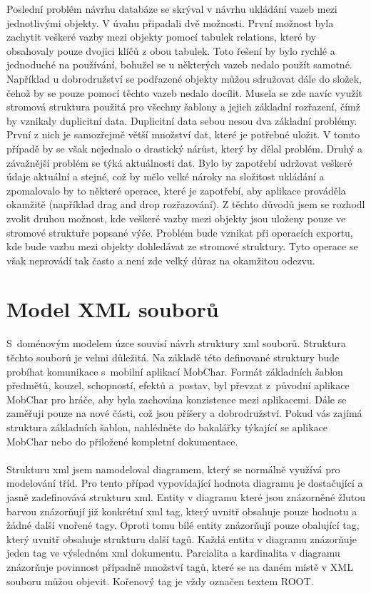 \documentclass[thesis=B,czech]{resources/FITthesis}[2012/06/26]
\begin{document}
Poslední problém návrhu databáze se skrýval v návrhu ukládání vazeb mezi jednotlivými objekty. V úvahu připadali dvě možnosti. První možnost byla zachytit veškeré vazby mezi objekty pomocí tabulek relations, které by obsahovaly pouze dvojici klíčů z obou tabulek. Toto řešení by bylo rychlé a jednoduché na používání, bohužel se u některých vazeb nedalo použít samotné. Například u dobrodružství se podřazené objekty můžou sdružovat dále do složek, čehož by se pouze pomocí těchto vazeb nedalo docílit. Musela se zde navíc využít stromová struktura použitá pro všechny šablony a jejich základní rozřazení, čímž by vznikaly duplicitní data. Duplicitní data sebou nesou dva základní problémy. První z nich je samozřejmě větší množství dat, které je potřebné uložit. V tomto případě by se však nejednalo o drastický nárůst, který by dělal problém. Druhý a závažnější problém se týká aktuálnosti dat. Bylo by zapotřebí udržovat veškeré údaje aktuální a stejné, což by mělo velké nároky na složitost ukládání a zpomalovalo by to některé operace, které je zapotřebí, aby aplikace prováděla okamžitě (například drag and drop rozřazování). Z těchto důvodů jsem se rozhodl zvolit druhou možnost, kde veškeré vazby mezi objekty jsou uloženy pouze ve stromové struktuře popsané výše. Problém bude vznikat při operacích exportu, kde bude vazbu mezi objekty dohledávat ze stromové struktury. Tyto operace se však neprovádí tak často a není zde velký důraz na okamžitou odezvu. 

	\section{Model XML souborů}
S~doménovým modelem úzce souvisí návrh struktury xml souborů. Struktura těchto souborů je velmi důležitá. Na základě této definované struktury bude probíhat komunikace s~mobilní aplikací MobChar. Formát základních šablon předmětů, kouzel, schopností, efektů a~postav, byl převzat z~původní aplikace MobChar pro hráče, aby byla zachována konzistence mezi aplikacemi. Dále se zaměřuji pouze na nové části, což jsou příšery a dobrodružství. Pokud vás zajímá struktura základních šablon, nahlédněte do bakalářky týkající se aplikace MobChar nebo do přiložené kompletní dokumentace.\\
\\
Strukturu xml jsem namodeloval diagramem, který se normálně využívá pro modelování tříd. Pro tento případ vypovídající hodnota diagramu je dostačující a jasně zadefinovává strukturu xml. Entity v diagramu které jsou znázorněné žlutou barvou znázorňují již konkrétní xml tag, který uvnitř obsahuje pouze hodnotu a žádné další vnořené tagy. Oproti tomu bílé entity znázorňují pouze obalující tag, který uvnitř obsahuje strukturu další tagů. Každá entita v diagramu znázorňuje jeden tag ve výsledném xml dokumentu. Parcialita a kardinalita v diagramu znázorňuje povinnost případně množství tagů, které se na daném místě v XML souboru můžou objevit. Kořenový tag je vždy označen textem  \clqq ROOT\crqq .
\end{document}
